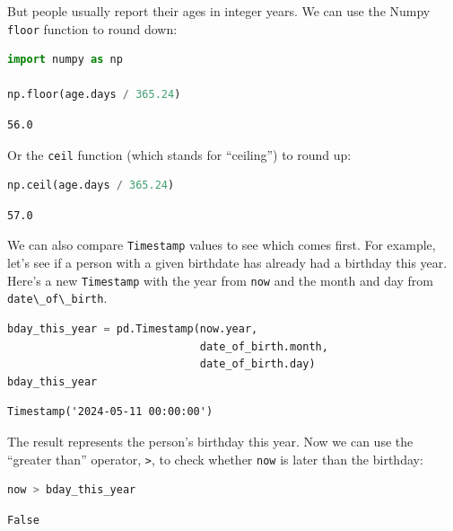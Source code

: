 But people usually report their ages in integer years. We can use the
Numpy \passthrough{\lstinline!floor!} function to round down:

\begin{lstlisting}[language=Python,style=source]
import numpy as np

np.floor(age.days / 365.24)
\end{lstlisting}

\begin{lstlisting}[style=output]
56.0
\end{lstlisting}

Or the \passthrough{\lstinline!ceil!} function (which stands for
``ceiling'') to round up:

\begin{lstlisting}[language=Python,style=source]
np.ceil(age.days / 365.24)
\end{lstlisting}

\begin{lstlisting}[style=output]
57.0
\end{lstlisting}

We can also compare \passthrough{\lstinline!Timestamp!} values to see
which comes first. For example, let's see if a person with a given
birthdate has already had a birthday this year. Here's a new
\passthrough{\lstinline!Timestamp!} with the year from
\passthrough{\lstinline!now!} and the month and day from
\passthrough{\lstinline!date\_of\_birth!}.

\begin{lstlisting}[language=Python,style=source]
bday_this_year = pd.Timestamp(now.year, 
                              date_of_birth.month, 
                              date_of_birth.day)
bday_this_year
\end{lstlisting}

\begin{lstlisting}[style=output]
Timestamp('2024-05-11 00:00:00')
\end{lstlisting}

The result represents the person's birthday this year. Now we can use
the ``greater than'' operator, \passthrough{\lstinline!>!}, to check
whether \passthrough{\lstinline!now!} is later than the birthday:

\begin{lstlisting}[language=Python,style=source]
now > bday_this_year
\end{lstlisting}

\begin{lstlisting}[style=output]
False
\end{lstlisting}


